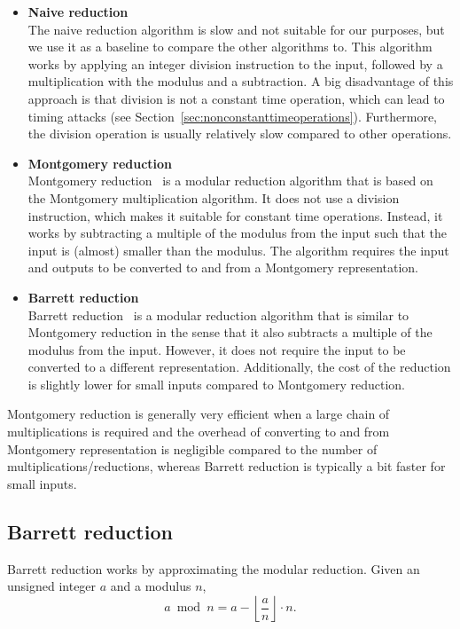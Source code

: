 \documentclass[11pt,a4paper]{report}
\theoremstyle{definition}
\begin{document}
\begin{itemize}
  \item \textbf{Naive reduction}\\
        The naive reduction algorithm is slow and not suitable for our purposes, but we use it as a baseline to compare the other algorithms to. This algorithm works by applying an integer division instruction to the input, followed by a multiplication with the modulus and a subtraction. A big disadvantage of this approach is that division is not a constant time operation, which can lead to timing attacks (see Section~\ref{sec:nonconstanttimeoperations}). Furthermore, the division operation is usually relatively slow compared to other operations.
  \item \textbf{Montgomery reduction}\\
        Montgomery reduction~\cite{montgomery1985modular} is a modular reduction algorithm that is based on the Montgomery multiplication algorithm. It does not use a division instruction, which makes it suitable for constant time operations. Instead, it works by subtracting a multiple of the modulus from the input such that the input is (almost) smaller than the modulus. The algorithm requires the input and outputs to be converted to and from a Montgomery representation.
  \item \textbf{Barrett reduction}\\
        Barrett reduction~\cite{barrett1986implementing} is a modular reduction algorithm that is similar to Montgomery reduction in the sense that it also subtracts a multiple of the modulus from the input. However, it does not require the input to be converted to a different representation. Additionally, the cost of the reduction is slightly lower for small inputs compared to Montgomery reduction.
\end{itemize}

Montgomery reduction is generally very efficient when a large chain of multiplications is required and the overhead of converting to and from Montgomery representation is negligible compared to the number of multiplications/reductions, whereas Barrett reduction is typically a bit faster for small inputs.

\subsection{Barrett reduction}
\label{sec:barrettreduction}
Barrett reduction works by approximating the modular reduction. Given an unsigned integer $a$ and a modulus $n$,
\[
  a \bmod n = a - \left\lfloor \frac{a}{n} \right\rfloor \cdot n.
\]
\end{document}
